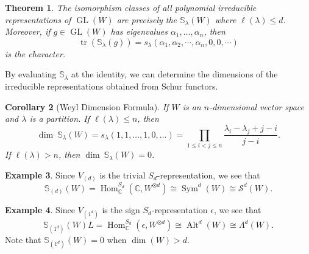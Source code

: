 \documentclass[12pt]{article}
\theoremstyle{plain}
\newtheorem{theorem}{Theorem}[section]
\newtheorem{corollary}[theorem]{Corollary}
\theoremstyle{definition}
\newtheorem{example}[theorem]{Example}
\theoremstyle{remark}
\numberwithin{equation}{section}
\begin{document}
\begin{theorem}
The isomorphism classes of all \emph{polynomial}
irreducible representations
of $\operatorname{GL}(W)$ are precisely the $\mathbb{S}_\lambda(W)$
where $\ell(\lambda) \le d$.
Moreover, if $g \in \operatorname{GL}(W)$ has eigenvalues
$\alpha_1,\ldots, \alpha_n$, then
\[
\operatorname{tr}(\mathbb{S}_\lambda(g)) = s_\lambda(\alpha_1,\alpha_2,\cdots,
\alpha_n,0,0,\cdots)
\]
is the character.
\end{theorem}

By evaluating $\mathbb{S}_\lambda$ at the identity, we can determine the
dimensions of the irreducible representations obtained from Schur
functors.

\begin{corollary}[Weyl Dimension Formula]
If $W$ is an $n$-dimensional vector space and $\lambda$ is a partition.
If $\ell(\lambda) \le n$, then
\[
\dim\ \mathbb{S}_\lambda(W) = s_\lambda(1,1,\ldots,1,0,\ldots)
= \prod_{1 \le i < j \le n} \frac{\lambda_i-\lambda_j +  j - i}{j-i}.
\]
If $\ell(\lambda) > n$, then $\dim\ \mathbb{S}_\lambda(W) = 0$.
\end{corollary}

\begin{example}
Since $V_{(d)}$ is the trivial $S_d$-representation,
we see that
\[
\mathbb{S}_{(d)}(W) = \operatorname{Hom}^{S_d}_{\mathbb{C}}(\mathbb{C},W^{\otimes d})
\cong \operatorname{Sym}^d(W) \cong \mathcal{S}^d(W) .
\]
\end{example}

\begin{example}
Since $V_{(1^d)}$ is the sign $S_d$-representation $\epsilon$,
we see that
\[
\mathbb{S}_{(1^d)}(W)L = \operatorname{Hom}^{S_d}_{\mathbb{C}}(\epsilon,W^{\otimes d})
\cong \operatorname{Alt}^d(W) \cong \Lambda^d(W) .
\]
Note that $\mathbb{S}_{(1^d)}(W)=0$ when $\dim(W) > d$.
\end{example}



\end{document}
